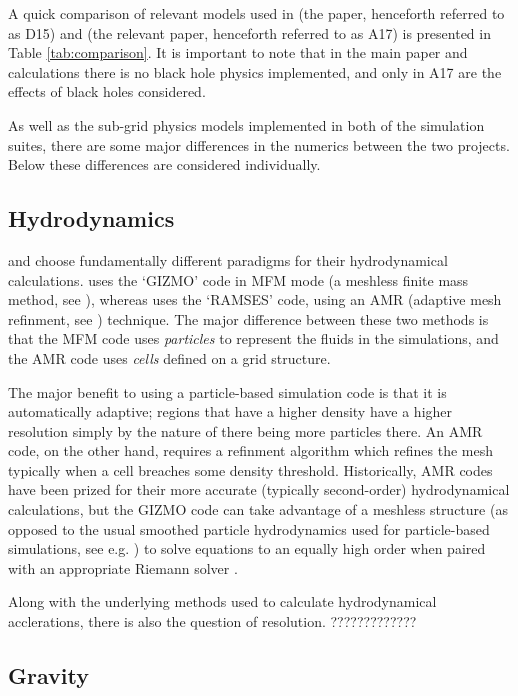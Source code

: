 A quick comparison of relevant models used in \citet{dubois_black_2015}
(the \hagn{} paper, henceforth referred to as D15) and
\citet{angles-alcazar_black_2017} (the relevant \fire paper, henceforth
referred to as A17) is presented in Table \ref{tab:comparison}. It is important
to note that in the main \fire{} paper \citep{hopkins_fire-2_2017} and 
calculations there is no black hole physics implemented, and only in A17 are
the effects of black holes considered.

As well as the sub-grid physics models implemented in both of the simulation
suites, there are some major differences in the numerics between the two
projects. Below these differences are considered individually.

\subsection{Hydrodynamics}

\hagn{} and \fire{} choose fundamentally different paradigms for their
hydrodynamical calculations. \fire{} uses the `GIZMO' code in MFM mode
(a meshless finite mass method, see \citet{hopkins_gizmo_2015}), whereas
\hagn{} uses the `RAMSES' code, using an AMR (adaptive mesh refinment, see
\citet{romain_cosmological_2001}) technique. The major difference between
these two methods is that the MFM code uses \emph{particles} to represent
the fluids in the simulations, and the AMR code uses \emph{cells} defined
on a grid structure.

The major benefit to using a particle-based simulation code is that it is
automatically adaptive; regions that have a higher density have a higher
resolution simply by the nature of there being more particles there. An AMR
code, on the other hand, requires a refinment algorithm which refines the mesh
typically when a cell breaches some density threshold. Historically, AMR codes
have been prized for their more accurate (typically second-order)
hydrodynamical calculations, but the GIZMO code can take advantage of a
meshless structure (as opposed to the usual smoothed particle hydrodynamics
used for particle-based simulations, see e.g.
\citet{springel_cosmological_2005}) to solve equations to an equally high order
when paired with an appropriate Riemann solver \citep{hopkins_gizmo_2015,
hopkins_new_2017}.

Along with the underlying methods used to calculate hydrodynamical
acclerations, there is also the question of resolution. ?????????????

\subsection{Gravity}

